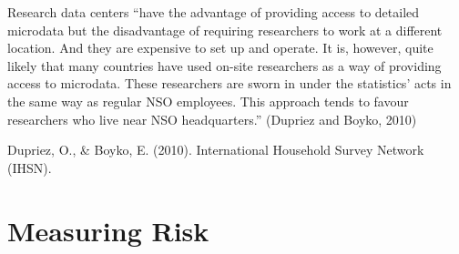 \documentclass[letterpaper,10pt,english]{sphinxmanual}
\begin{document}
Research data centers “have the advantage of providing access to
detailed microdata but the disadvantage of requiring researchers to work
at a different location. And they are expensive to set up and operate.
It is, however, quite likely that many countries have used on-site
researchers as a way of providing access to microdata. These researchers
are sworn in under the statistics’ acts in the same way as regular NSO
employees. This approach tends to favour researchers who live near NSO
headquarters.” (Dupriez and Boyko, 2010)


Dupriez, O., \& Boyko, E. (2010).  International Household Survey
Network (IHSN).


\chapter{Measuring Risk}
\label{\detokenize{measure_risk::doc}}\label{\detokenize{measure_risk:measuring-risk}}
\end{document}
